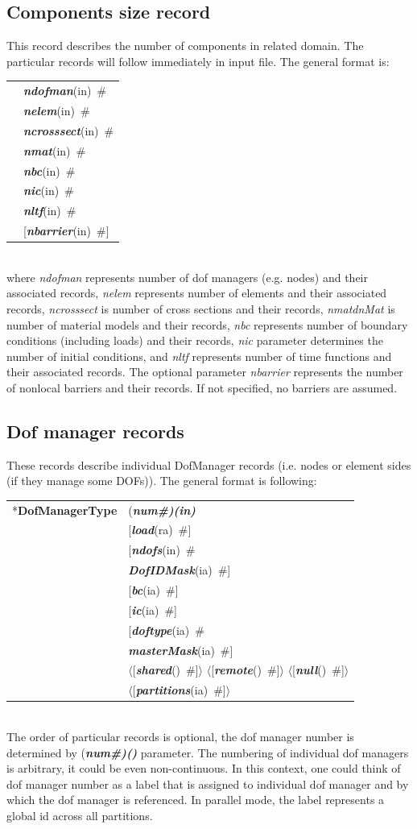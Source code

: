 \documentclass[a4paper]{article}
\makeatletter
\newcommand{\param}[1]{{\em #1}}
\newcommand{\fieldVal}[2]{\mbox{({\it\bf{#1}\#)\tiny (#2)}}}
\newcommand{\keywordnotype}[1]{\mbox{{\it{\bf{#1}}}}}
\newcommand{\keyword}[2]{\mbox{{\keywordnotype{#1}\tiny (#2)}}}
\newcommand{\entKeyword}[1]{\mbox{{*{\bf{#1}}}}}
\newcommand{\field}[2]{\mbox{\keyword{#1}{#2}~\#}}
\newcommand{\optField}[2]{\mbox{[\field{#1}{#2}]}}
\newcommand{\Pmode}[1]{{\sffamily #1}}
\newcommand{\PoptField}[2]{\mbox{$\langle$[\field{#1}{#2}]$\rangle$}}
\newenvironment{record}[1][]{\begin{tabular}{|ll}}{\end{tabular}\\}
\newcommand{\recentry}[2]{{#1}&{#2}\\}
\newcounter{rcc}
\newenvironment{record}[1][\textwidth]{\setcounter{rcc}{0}\begin{tabular*}{#1}{|ll@{\extracolsep{\fill}}r}}{\end{tabular*}\\}
\newcommand{\recentry}[2]{\ifthenelse{\value{rcc}>0}{&$\backslash$ \\}{\setcounter{rcc}{1}}{#1}&{#2}}
\makeatother
\begin{document}
\subsection{Components size record}
\label{_ComponentsSizeRecord}
This record describes the number of components in related domain. The
particular records will follow immediately in input file. The general format is:\\
\begin{record}
  \recentry{}{\field{ndofman}{in}}  \recentry{}{\field{nelem}{in}}
  \recentry{}{\field{ncrosssect}{in}}  \recentry{}{\field{nmat}{in}}  \recentry{}{\field{nbc}{in}}
  \recentry{}{\field{nic}{in}}  \recentry{}{\field{nltf}{in}} \recentry{}{\optField{nbarrier}{in}}
\end{record}
where \param{ndofman} represents number of dof managers (e.g. nodes) and their associated  records,
\param{nelem} represents number of elements and their associated records, \param{ncrosssect} is
number of cross sections and their records, \param{nmatdnMat}{} is number of material
models and their records, \param{nbc}{} represents number of boundary
conditions (including loads) and their
records, \param{nic} parameter determines the number of initial
conditions, and \param{nltf} represents number of time functions and
their associated records. The optional parameter \param{nbarrier}
represents the number of nonlocal barriers and their records. If not
specified, no barriers are assumed.

\subsection{Dof manager records}
\label{_NodeElementSideRecords}
These records describe individual DofManager records (i.e. nodes or element sides (if they manage some DOFs)). The general format is following:

\noindent
\begin{record}
  \recentry{\entKeyword{DofManagerType}}{\fieldVal{num}{in}}
           \recentry{}{[\field{load}{ra}]} \recentry{}{[\field{ndofs}{in}}
             \recentry{}{\field{DofIDMask}{ia}]}
           \recentry{}{\optField{bc}{ia}} \recentry{}{\optField{ic}{ia}}
           \recentry{}{[\field{doftype}{ia}} \recentry{}{\field{masterMask}{ia}]}
           \recentry{}{\PoptField{shared}{} \PoptField{remote}{} \PoptField{null}{}}
             \recentry{}{\PoptField{partitions}{ia}}
\end{record}
The order of particular records is optional, the dof manager number is determined by \fieldVal{num}{} parameter.
The numbering of individual dof managers is arbitrary, it could be even non-continuous. In this context, one could think of dof manager number as a label that is assigned to individual dof manager and by which the dof manager is referenced. 
\Pmode{In parallel mode, the label represents a global id across all partitions.}
 
\end{document}
